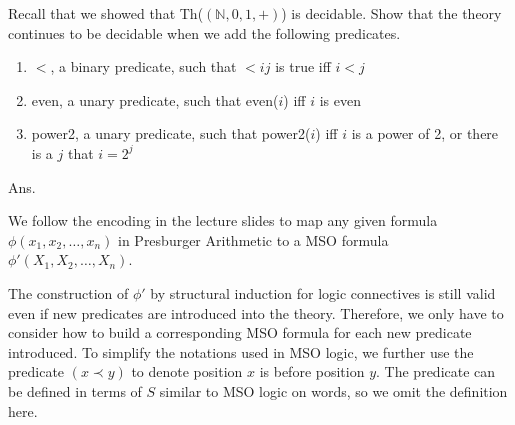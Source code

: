 \documentclass[11pt]{homework}
\begin{document}
\maketitle


\question
 Recall that we showed that Th(\((\mathbb{N},0,1,+)\)) is decidable. 
 Show that the theory continues to be decidable when we add the following predicates.

\begin{enumerate}
  \item \(<\), a binary predicate, such that \(< ij\) is true iff \(i < j\)
  \item even, a unary predicate, such that even(\(i\)) iff \(i\) is even
  \item power2, a unary predicate,
        such that power2(\(i\)) iff \(i\) is a power of 2,
        or there is a \(j\) that \(i = 2^j\)
\end{enumerate}

Ans.

We follow the encoding in the lecture slides to map any given formula 
\(\phi (x_1, x_2,\dotsc,x_n)\) in Presburger Arithmetic to a MSO formula
\(\phi'(X_1, X_2,\dotsc,X_n)\).

The construction of \(\phi'\) by structural induction for logic connectives
is still valid even if new predicates are introduced into the theory.
Therefore, we only have to consider how to build a corresponding MSO formula for
each new predicate introduced.
To simplify the notations used in MSO logic,
we further use the predicate \((x \prec y)\) to denote position \(x\) is
before position \(y\).
The predicate can be defined in terms of \(S\) similar to MSO logic on words,
so we omit the definition here.
\end{document}
